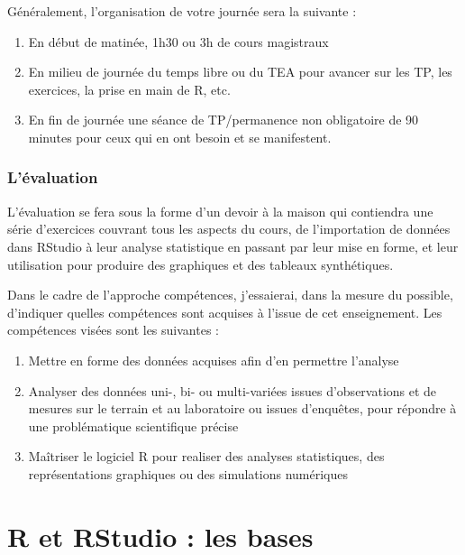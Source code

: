 \documentclass[a4paperpaper,]{article}
\providecommand{\tightlist}{%
  \setlength{\itemsep}{0pt}\setlength{\parskip}{0pt}}
\theoremstyle{definition}
\theoremstyle{definition}
\theoremstyle{definition}
\theoremstyle{remark}
\begin{document}
Généralement, l'organisation de votre journée sera la suivante :

\begin{enumerate}
\def\labelenumi{\arabic{enumi}.}
\tightlist
\item
  En début de matinée, 1h30 ou 3h de cours magistraux
\item
  En milieu de journée du temps libre ou du TEA pour avancer sur les TP,
  les exercices, la prise en main de R, etc.
\item
  En fin de journée une séance de TP/permanence non obligatoire de 90
  minutes pour ceux qui en ont besoin et se manifestent.
\end{enumerate}

\hypertarget{levaluation}{%
\subsubsection{L'évaluation}\label{levaluation}}

L'évaluation se fera sous la forme d'un devoir à la maison qui
contiendra une série d'exercices couvrant tous les aspects du cours, de
l'importation de données dans RStudio à leur analyse statistique en
passant par leur mise en forme, et leur utilisation pour produire des
graphiques et des tableaux synthétiques.

Dans le cadre de l'approche compétences, j'essaierai, dans la mesure du
possible, d'indiquer quelles compétences sont acquises à l'issue de cet
enseignement. Les compétences visées sont les suivantes :

\begin{enumerate}
\def\labelenumi{\arabic{enumi}.}
\tightlist
\item
  Mettre en forme des données acquises afin d'en permettre l'analyse
\item
  Analyser des données uni-, bi- ou multi-variées issues d'observations
  et de mesures sur le terrain et au laboratoire ou issues d'enquêtes,
  pour répondre à une problématique scientifique précise
\item
  Maîtriser le logiciel R pour realiser des analyses statistiques, des
  représentations graphiques ou des simulations numériques
\end{enumerate}

\hypertarget{bases}{%
\section{R et RStudio : les bases}\label{bases}}
\end{document}
